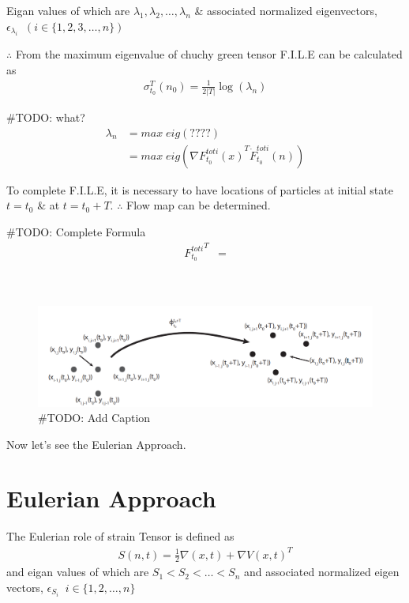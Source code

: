\documentclass[../report.tex]{subfiles}
\begin{document}
Eigan values of which are \(\lambda_1, \lambda_2, \dots, \lambda_n\) \& associated normalized eigenvectors, \(\epsilon_{\lambda_i}\;\; (i \in \{1, 2, 3, \dots, n\})\)

\(\therefore\) From the maximum eigenvalue of chuchy green tensor F.I.L.E can be calculated as
\begin{equation}
  \begin{aligned}
    \sigma_{t_0}^T (n_0) = \frac{1}{2|T|} \log(\lambda_n)
  \end{aligned}
\end{equation}

\#TODO: what?
\begin{equation}
  \begin{aligned}
    \lambda_n &= max\; eig (????) \\
    &= max\; eig(\nabla {F_{t_0}^{toti}(x)}^T \dot F_{t_0}^{toti}(n))
  \end{aligned}
\end{equation}

To complete F.I.L.E, it is necessary to have locations of particles at initial state \(t = t_0\) \& at \(t = t_0 + T\). \(\therefore\) Flow map can be determined.

\#TODO: Complete Formula
\begin{equation}
  \begin{aligned}
    {F_{t_0}^{toti}}^T &=
  \end{aligned}
\end{equation}
~ \\ ~ \\
\begin{figure}[H]
  \centering
  \includegraphics[width=0.8\linewidth]{images/image_1.png}
  \caption{\#TODO: Add Caption}
  \label{fig:fig-1}
\end{figure}

Now let's see the Eulerian Approach. \par

\section{Eulerian Approach}
The Eulerian role of strain Tensor is defined as
\begin{equation}
  \begin{aligned}
    S(n, t) = \frac{1}{2}{\nabla(x, t) + \nabla V(x, t)^T}
  \end{aligned}
\end{equation}
and eigan values of which are \(S_1 < S_2 < \dots < S_n\) and associated normalized eigen vectors, \(\epsilon_{S_i}\;\; i \in \{1, 2, \dots, n\}\) \par
\end{document}
